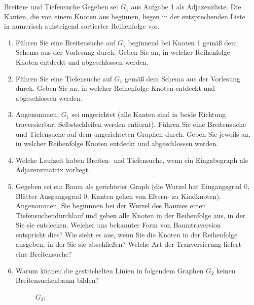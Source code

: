 \documentclass[11pt,a4paper]{article}
\begin{document}
\begin{aufgabe}{2}{Breiten- und Tiefensuche}
    Gegeben sei $G_1$ aus Aufgabe 1 als Adjazenzliste.
    Die Kanten, die von einem Knoten aus beginnen, liegen in der entsprechenden Liste in numerisch aufsteigend sortierter Reihenfolge vor.
    \begin{enumerate}
        \item Führen Sie eine Breitensuche auf $G_1$ beginnend bei Knoten 1 gemäß dem Schema aus der Vorlesung durch.
        Geben Sie an, in welcher Reihenfolge Knoten ent\-deckt und abgeschlossen werden.
        \item Führen Sie eine Tiefensuche auf $G_1$ gemäß dem Schema aus der Vorlesung durch.
        Geben Sie an, in welcher Reihenfolge Knoten entdeckt und abgeschlossen werden.
        \item Angenommen, $G_1$ sei ungerichtet (alle Kanten sind in beide Richtung traversierbar, Selbstschleifen werden entfernt).
        Führen Sie eine Breitensuche und Tiefensuche auf dem ungerichteten Graphen durch.
        Geben Sie jeweils an, in welcher Reihenfolge Knoten entdeckt und abgeschlossen werden.
        \item Welche Laufzeit haben Breiten- und Tiefensuche, wenn ein Eingabegraph als Adjazenzmatrix vorliegt.
        \item
        Gegeben sei ein Baum als gerichteter Graph (die Wurzel hat Eingangsgrad 0, Blätter Ausgangsgrad 0, Kanten gehen von Eltern- zu Kindknoten).
        Angenommen, Sie beginnnen bei der Wurzel des Baumes einen Tiefensuchendurchlauf und geben alle Knoten in der Reihenfolge aus, in der Sie sie entdecken.
        Welcher uns bekannter Form von Baumtraversion entspricht dies?
        Wie sieht es aus, wenn Sie die Knoten in der Reihenfolge ausgeben, in der Sie sie abschließen?
        Welche Art der Tranversierung liefert eine Breitensuche?
        \item
        Warum können die gestrichelten Linien in folgendem Graphen $G_2$ keinen Breitensuchenbaum bilden?
        \begin{figure}[h!]
            \centering
        $G_2$:
        \begin{subfigure}[c]{0.2\textwidth}
            \centering
\end{subfigure}
\end{figure}
\end{enumerate}
\end{aufgabe}
\end{document}
